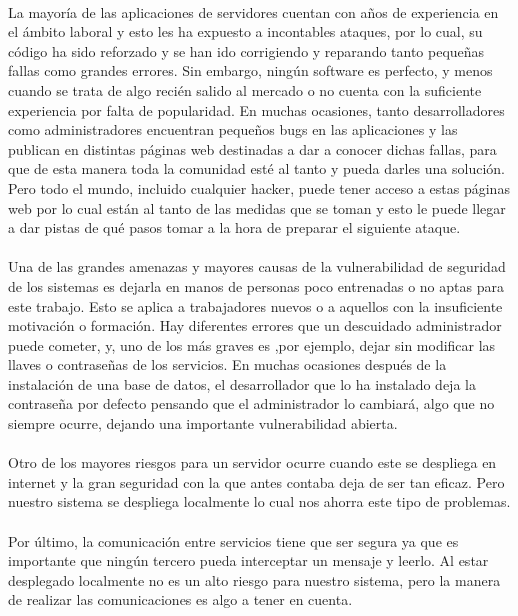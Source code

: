 \paragraph{}
La mayoría de las aplicaciones de servidores cuentan con años de experiencia en el ámbito laboral y esto les ha expuesto a incontables ataques, por lo cual, su código ha sido reforzado y se han ido corrigiendo y reparando tanto pequeñas fallas como grandes errores. Sin embargo, ningún software es perfecto, y menos cuando se trata de algo recién salido al mercado o no cuenta con la suficiente experiencia por falta de popularidad. En muchas ocasiones, tanto desarrolladores como administradores encuentran pequeños bugs en las aplicaciones y las publican en distintas páginas web destinadas a dar a conocer dichas fallas, para que de esta manera toda la comunidad esté al tanto y pueda darles una solución. Pero todo el mundo, incluido cualquier hacker, puede tener acceso a estas páginas web por lo cual están al tanto de las medidas que se toman y esto le puede llegar a dar pistas de qué pasos tomar a la hora de preparar el siguiente ataque. 
\paragraph{}
Una de las grandes amenazas y mayores causas de la vulnerabilidad de seguridad de los sistemas es dejarla en manos de personas poco entrenadas o no aptas para este trabajo. Esto se aplica a trabajadores nuevos o a aquellos con la insuficiente motivación o formación. Hay diferentes errores que un descuidado administrador puede cometer, y, uno de los más graves es ,por ejemplo, dejar sin modificar las llaves o contraseñas de los servicios. En muchas ocasiones después de la instalación de una base de datos, el desarrollador que lo ha instalado deja la contraseña por defecto pensando que el administrador lo cambiará, algo que no siempre ocurre, dejando una importante vulnerabilidad abierta. 
\paragraph{}
Otro de los mayores riesgos para un servidor ocurre cuando este se despliega en internet y la gran seguridad con la que antes contaba deja de ser tan eficaz. Pero nuestro sistema se despliega localmente lo cual nos ahorra este tipo de problemas.
\paragraph{}
Por último, la comunicación entre servicios tiene que ser segura ya que es importante que ningún tercero pueda interceptar un mensaje y leerlo. Al estar desplegado localmente no es un alto riesgo para nuestro sistema, pero la manera de realizar las comunicaciones es algo a tener en cuenta.

